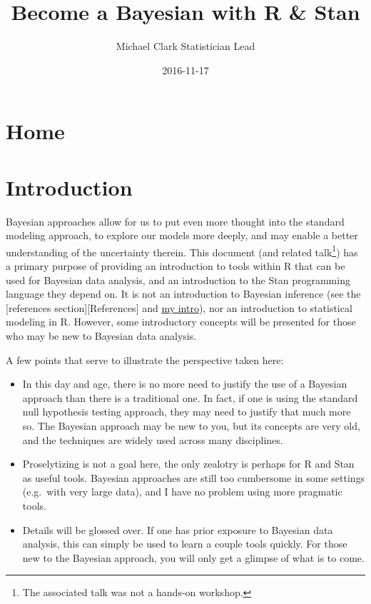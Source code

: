 \documentclass[]{book}
\title{{Become a Bayesian with R \& Stan}}
\author{{Michael Clark} {Statistician Lead}}
\date{2016-11-17}
\let\rmarkdownfootnote\footnote%
\def\footnote{\protect\rmarkdownfootnote}
\begin{document}
\maketitle

{
\setcounter{tocdepth}{1}
\tableofcontents
}
\chapter{\texorpdfstring{{Home}}{Home}}\label{home}

\chapter{Introduction}\label{introduction}

 Bayesian
approaches allow for us to put even more thought into the standard
modeling approach, to explore our models more deeply, and may enable a
better understanding of the uncertainty therein. This document (and
related talk\footnote{The associated talk was not a hands-on workshop.})
has a primary purpose of providing an introduction to tools within R
that can be used for Bayesian data analysis, and an introduction to the
Stan programming language they depend on. It is not an introduction to
Bayesian inference (see the {[}references section{]}{[}References{]} and
\href{http://m-clark.github.io/docs/IntroBayes.html}{my intro}), nor an
introduction to statistical modeling in R. However, some introductory
concepts will be presented for those who may be new to Bayesian data
analysis.

A few points that serve to illustrate the perspective taken here:

\begin{itemize}
\item
  In this day and age, there is no more need to justify the use of a
  Bayesian approach than there is a traditional one. In fact, if one is
  using the standard null hypothesis testing approach, they may need to
  justify that much more so. The Bayesian approach may be new to you,
  but its concepts are very old, and the techniques are widely used
  across many disciplines.
\item
  Proselytizing is not a goal here, the only zealotry is perhaps for R
  and Stan as useful tools. Bayesian approaches are still too cumbersome
  in some settings (e.g.~with very large data), and I have no problem
  using more pragmatic tools.
\item
  Details will be glossed over. If one has prior exposure to Bayesian
  data analysis, this can simply be used to learn a couple tools
  quickly. For those new to the Bayesian approach, you will only get a
  glimpse of what is to come.
\end{itemize}
\end{document}
